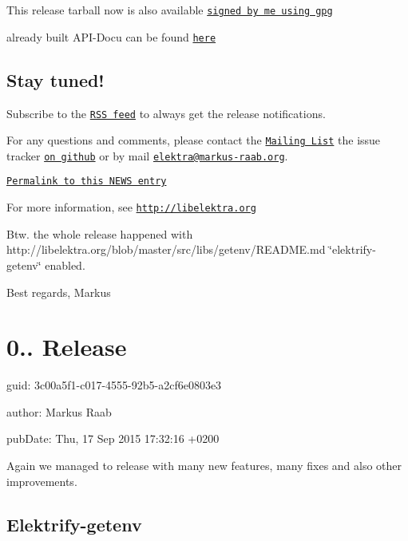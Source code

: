 This release tarball now is also available \href{http://www.libelektra.org/ftp/elektra/releases/elektra-0.8.14.tar.gz.gpg}{\tt signed by me using gpg}

already built A\+P\+I-\/\+Docu can be found \href{http://doc.libelektra.org/api/0.8.14/html/}{\tt here}

\subsection*{Stay tuned!}

Subscribe to the \href{http://doc.libelektra.org/news/feed.rss}{\tt R\+S\+S feed} to always get the release notifications.

For any questions and comments, please contact the \href{https://lists.sourceforge.net/lists/listinfo/registry-list}{\tt Mailing List} the issue tracker \href{http://git.libelektra.org/issues}{\tt on github} or by mail \href{mailto:elektra@markus-raab.org}{\tt elektra@markus-\/raab.\+org}.

\href{http://doc.libelektra.org/news/519cbfac-6db5-4594-8a38-dec4c84b134f.html}{\tt Permalink to this N\+E\+W\+S entry}

For more information, see \href{http://libelektra.org}{\tt http\+://libelektra.\+org}

Btw. the whole release happened with http\+://libelektra.org/blob/master/src/libs/getenv/\+R\+E\+A\+D\+M\+E.\+md \char`\"{}elektrify-\/getenv\char`\"{} enabled.

Best regards, Markus

\section*{0.. Release}


\begin{DoxyItemize}
\item guid\+: 3c00a5f1-\/c017-\/4555-\/92b5-\/a2cf6e0803e3
\item author\+: Markus Raab
\item pub\+Date\+: Thu, 17 Sep 2015 17\+:32\+:16 +0200
\end{DoxyItemize}

Again we managed to release with many new features, many fixes and also other improvements.

\subsection*{Elektrify-\/getenv}

